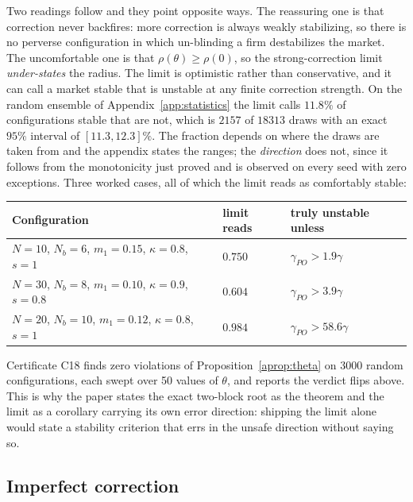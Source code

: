 Two readings follow and they point opposite ways. The reassuring one is that correction never backfires: more correction is always weakly stabilizing, so there is no perverse configuration in which un-blinding a firm destabilizes the market. The uncomfortable one is that $\rho(\theta) \geq \rho(0)$, so the strong-correction limit \emph{under-states} the radius. The limit is optimistic rather than conservative, and it can call a market stable that is unstable at any finite correction strength. On the random ensemble of Appendix~\ref{app:statistics} the limit calls $11.8\%$ of configurations stable that are not, which is $2157$ of $18313$ draws with an exact $95\%$ interval of $[11.3,12.3]\%$. The fraction depends on where the draws are taken from and the appendix states the ranges; the \emph{direction} does not, since it follows from the monotonicity just proved and is observed on every seed with zero exceptions. Three worked cases, all of which the limit reads as comfortably stable:

\begin{center}
\small
\begin{tabular}{lll}
\toprule
Configuration & limit reads & truly unstable unless \\
\midrule
$N=10$, $N_b=6$, $m_1=0.15$, $\kappa=0.8$, $s=1$ & $0.750$ & $\gamma_{PO} > 1.9\gamma$ \\
$N=30$, $N_b=8$, $m_1=0.10$, $\kappa=0.9$, $s=0.8$ & $0.604$ & $\gamma_{PO} > 3.9\gamma$ \\
$N=20$, $N_b=10$, $m_1=0.12$, $\kappa=0.8$, $s=1$ & $0.984$ & $\gamma_{PO} > 58.6\gamma$ \\
\bottomrule
\end{tabular}
\end{center}

Certificate C18 finds zero violations of Proposition~\ref{aprop:theta} on 3000 random configurations, each swept over 50 values of $\theta$, and reports the verdict flips above. This is why the paper states the exact two-block root as the theorem and the limit as a corollary carrying its own error direction: shipping the limit alone would state a stability criterion that errs in the unsafe direction without saying so.

\subsection{Imperfect correction}


